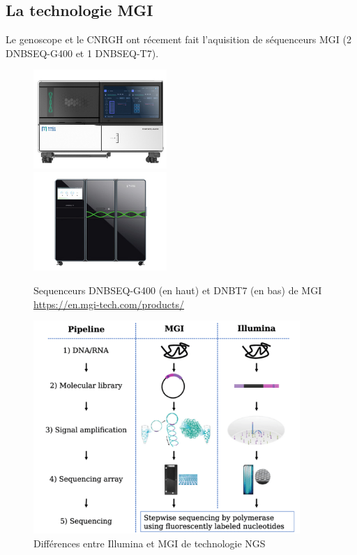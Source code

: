 \subsection{La technologie MGI}
Le genoscope et le CNRGH ont récement fait l'aquisition de séquenceurs MGI (2 DNBSEQ-G400 et 1 DNBSEQ-T7).

\begin{minipage}{0.45\textwidth}
    \begin{figure}[H]
        \centering
        \includegraphics[width=0.45\textwidth]{img/MGI_G400.jpg}\\
        \includegraphics[width=0.45\textwidth]{img/MGI_T7.jpg}
        \caption{\footnotesize{Sequenceurs DNBSEQ-G400 (en haut) et DNBT7 (en bas) de MGI \href{https://en.mgi-tech.com/products/}{https://en.mgi-tech.com/products/}}}
        \label{seq-MGI}
    \end{figure}
\end{minipage} 
\hfill
\begin{minipage}{0.45\textwidth}
	\begin{figure}[H]
        \centering
        \includegraphics[width=0.9\textwidth]{img/MGI_vs_Illumina.png}
        \caption{\footnotesize{Différences entre Illumina et MGI de technologie NGS}}
        \label{fig-Illu-vs-MGI}
    \end{figure}
\end{minipage}\\\\


